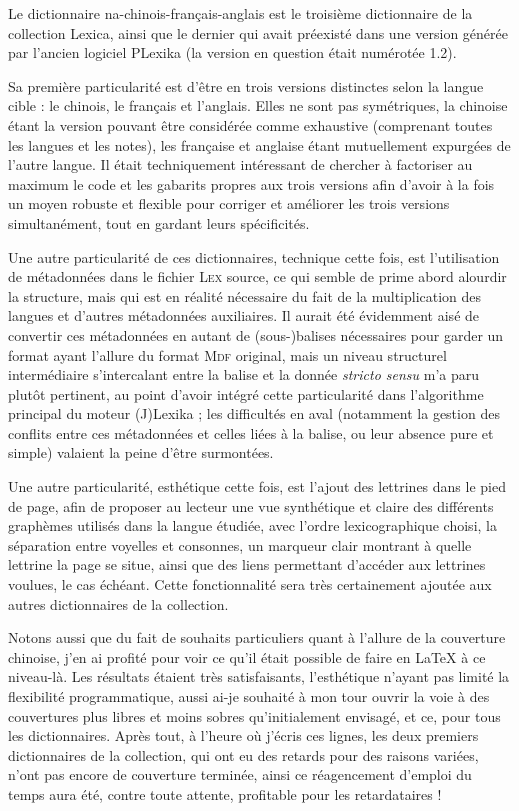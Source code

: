 Le dictionnaire na-chinois-français-anglais est le troisième dictionnaire de la collection Lexica, ainsi que le dernier qui avait préexisté dans une version générée par l’ancien logiciel PLexika (la version en question était numérotée 1.2).

Sa première particularité est d’être en trois versions distinctes selon la langue cible : le chinois, le français et l’anglais. Elles ne sont pas symétriques, la chinoise étant la version pouvant être considérée comme exhaustive (comprenant toutes les langues et les notes), les française et anglaise étant mutuellement expurgées de l’autre langue. Il était techniquement intéressant de chercher à factoriser au maximum le code et les gabarits propres aux trois versions afin d’avoir à la fois un moyen robuste et flexible pour corriger et améliorer les trois versions simultanément, tout en gardant leurs spécificités.

Une autre particularité de ces dictionnaires, technique cette fois, est l’utilisation de métadonnées dans le fichier \textsc{Lex} source, ce qui semble de prime abord alourdir la structure, mais qui est en réalité nécessaire du fait de la multiplication des langues et d’autres métadonnées auxiliaires. Il aurait été évidemment aisé de convertir ces métadonnées en autant de (sous-)balises nécessaires pour garder un format ayant l’allure du format \textsc{Mdf} original, mais un niveau structurel intermédiaire s’intercalant entre la balise et la donnée \emph{stricto sensu} m’a paru plutôt pertinent, au point d’avoir intégré cette particularité dans l’algorithme principal du moteur (J)Lexika ; les difficultés en aval (notamment la gestion des conflits entre ces métadonnées et celles liées à la balise, ou leur absence pure et simple) valaient la peine d’être surmontées.

Une autre particularité, esthétique cette fois, est l’ajout des lettrines dans le pied de page, afin de proposer au lecteur une vue synthétique et claire des différents graphèmes utilisés dans la langue étudiée, avec l’ordre lexicographique choisi, la séparation entre voyelles et consonnes, un marqueur clair montrant à quelle lettrine la page se situe, ainsi que des liens permettant d’accéder aux lettrines voulues, le cas échéant. Cette fonctionnalité sera très certainement ajoutée aux autres dictionnaires de la collection.

Notons aussi que du fait de souhaits particuliers quant à l’allure de la couverture chinoise, j’en ai profité pour voir ce qu’il était possible de faire en \LaTeX{} à ce niveau-là. Les résultats étaient très satisfaisants, l’esthétique n’ayant pas limité la flexibilité programmatique, aussi ai-je souhaité à mon tour ouvrir la voie à des couvertures plus libres et moins sobres qu’initialement envisagé, et ce, pour tous les dictionnaires. Après tout, à l’heure où j’écris ces lignes, les deux premiers dictionnaires de la collection, qui ont eu des retards pour des raisons variées, n’ont pas encore de couverture terminée, ainsi ce réagencement d’emploi du temps aura été, contre toute attente, profitable pour les retardataires !

